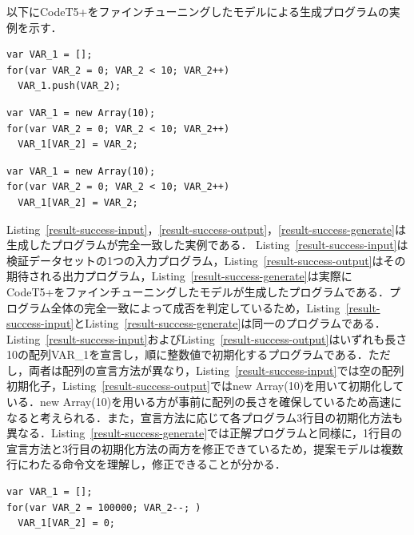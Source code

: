 \documentclass[submit,techrep,noauthor]{ipsj}
\begin{document}
以下にCodeT5+をファインチューニングしたモデルによる生成プログラムの実例を示す．

\begin{lstlisting}[caption=Result Success (Input), label=result-success-input,captionpos=t]
var VAR_1 = [];
for(var VAR_2 = 0; VAR_2 < 10; VAR_2++)
  VAR_1.push(VAR_2);
\end{lstlisting}

\begin{lstlisting}[caption=Result Success (Output), label=result-success-output,captionpos=t]
var VAR_1 = new Array(10);
for(var VAR_2 = 0; VAR_2 < 10; VAR_2++)
  VAR_1[VAR_2] = VAR_2;
\end{lstlisting}

\begin{lstlisting}[caption=Result Success (Generate), label=result-success-generate,captionpos=t]
var VAR_1 = new Array(10);
for(var VAR_2 = 0; VAR_2 < 10; VAR_2++)
  VAR_1[VAR_2] = VAR_2;
\end{lstlisting}

Listing~\ref{result-success-input}，\ref{result-success-output}，\ref{result-success-generate}は生成したプログラムが完全一致した実例である．
Listing~\ref{result-success-input}は検証データセットの1つの入力プログラム，Listing~\ref{result-success-output}はその期待される出力プログラム，Listing~\ref{result-success-generate}は実際にCodeT5+をファインチューニングしたモデルが生成したプログラムである．プログラム全体の完全一致によって成否を判定しているため，Listing~\ref{result-success-input}とListing~\ref{result-success-generate}は同一のプログラムである．Listing~\ref{result-success-input}およびListing~\ref{result-success-output}はいずれも長さ10の配列VAR\_1を宣言し，順に整数値で初期化するプログラムである．ただし，両者は配列の宣言方法が異なり，Listing~\ref{result-success-input}では空の配列初期化子，Listing~\ref{result-success-output}ではnew Array(10)を用いて初期化している．new Array(10)を用いる方が事前に配列の長さを確保しているため高速になると考えられる．また，宣言方法に応じて各プログラム3行目の初期化方法も異なる．Listing~\ref{result-success-generate}では正解プログラムと同様に，1行目の宣言方法と3行目の初期化方法の両方を修正できているため，提案モデルは複数行にわたる命令文を理解し，修正できることが分かる．

\begin{lstlisting}[caption=Result Failure (Input), label=result-failure-input,captionpos=t]
var VAR_1 = [];
for(var VAR_2 = 100000; VAR_2--; )
  VAR_1[VAR_2] = 0;
\end{lstlisting}
\end{document}
